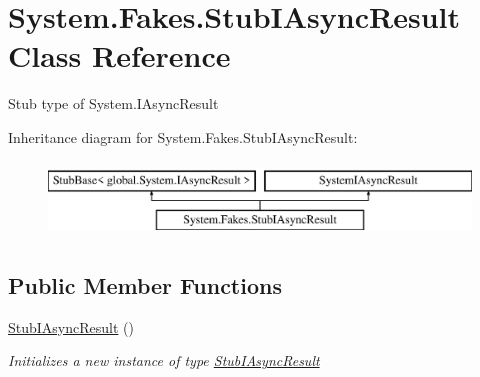 \hypertarget{class_system_1_1_fakes_1_1_stub_i_async_result}{\section{System.\-Fakes.\-Stub\-I\-Async\-Result Class Reference}
\label{class_system_1_1_fakes_1_1_stub_i_async_result}
}


Stub type of System.\-I\-Async\-Result 


Inheritance diagram for System.\-Fakes.\-Stub\-I\-Async\-Result\-:\begin{figure}[H]
\begin{center}
\leavevmode
\includegraphics[height=2.000000cm]{class_system_1_1_fakes_1_1_stub_i_async_result}
\end{center}
\end{figure}
\subsection*{Public Member Functions}
\begin{DoxyCompactItemize}
\item 
\hyperlink{class_system_1_1_fakes_1_1_stub_i_async_result_a285878891b2e345594dbe7eefe4b41bd}{Stub\-I\-Async\-Result} ()
\begin{DoxyCompactList}\small\item\em Initializes a new instance of type \hyperlink{class_system_1_1_fakes_1_1_stub_i_async_result}{Stub\-I\-Async\-Result}\end{DoxyCompactList}\end{DoxyCompactItemize}

